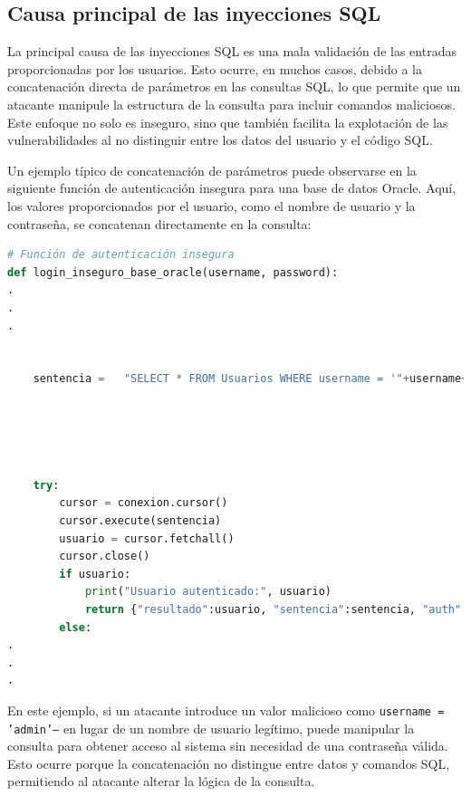 \documentclass[a4paper,12pt]{article}
\begin{document}
 \subsection{Causa principal de las inyecciones SQL}

 La principal causa de las inyecciones SQL es una mala validación de las entradas proporcionadas por los usuarios. Esto ocurre, en muchos casos, debido a la concatenación directa de parámetros en las consultas SQL, lo que permite que un atacante manipule la estructura de la consulta para incluir comandos maliciosos. Este enfoque no solo es inseguro, sino que también facilita la explotación de las vulnerabilidades al no distinguir entre los datos del usuario y el código SQL.
 \vspace{0,5cm}

 Un ejemplo típico de concatenación de parámetros puede observarse en la siguiente función de autenticación insegura para una base de datos Oracle. Aquí, los valores proporcionados por el usuario, como el nombre de usuario y la contraseña, se concatenan directamente en la consulta:
 \vspace{0,5cm}


 
\begin{lstlisting}[language=Python]
# Función de autenticación insegura
def login_inseguro_base_oracle(username, password):
.
.
.


    sentencia =   "SELECT * FROM Usuarios WHERE username = '"+username+"' AND password = '"+password+"'"



    

    try:
        cursor = conexion.cursor()
        cursor.execute(sentencia)
        usuario = cursor.fetchall()
        cursor.close()
        if usuario:
            print("Usuario autenticado:", usuario)
            return {"resultado":usuario, "sentencia":sentencia, "auth":"true"}
        else:
.
.
.
    \end{lstlisting}

 \vspace{0,5cm}

 En este ejemplo, si un atacante introduce un valor malicioso como \texttt{username = 'admin'--} en lugar de un nombre de usuario legítimo, puede manipular la consulta para obtener acceso al sistema sin necesidad de una contraseña válida. Esto ocurre porque la concatenación no distingue entre datos y comandos SQL, permitiendo al atacante alterar la lógica de la consulta.
 \vspace{0,5cm}
\end{document}
